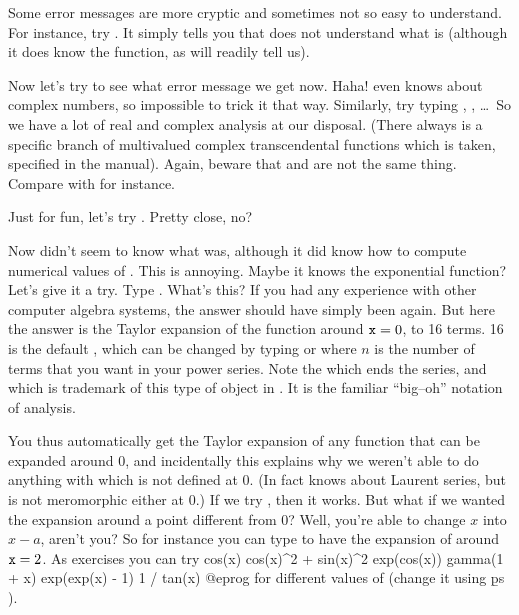 Some error messages are more cryptic and sometimes not so easy to understand.
For instance, try . It simply tells you that  does not
understand what  is (although it does know the 
function, as  will readily tell us).

Now let's try  to see what error message we get now. Haha!
 even knows about complex numbers, so impossible to trick it that
way. Similarly, try typing , , \dots\ So we have a lot of real and complex analysis at our disposal.
(There always is a specific branch of multivalued complex transcendental
functions which is taken, specified in the manual). Again, beware that
 and  are not the same thing. Compare  with
 for instance.

Just for fun, let's try . Pretty close, no?

\medskip
Now  didn't seem to know what  was, although it did know
how to compute numerical values of . This is annoying. Maybe it
knows the exponential function? Let's give it a try. Type .
What's this? If you had any experience with other computer algebra systems,
the answer should have simply been  again. But here the answer is
the Taylor expansion of the function around ${\tt x}=0$, to 16 terms. 16 is
the default , which can be changed by typing  or  where $n$ is the number of terms
that you want in your power series. Note the  which ends the
series, and which is trademark of this type of object in . It is the
familiar ``big--oh'' notation of analysis.

You thus automatically get the Taylor expansion of any function that can be
expanded around $0$, and incidentally this explains why we weren't able to do
anything with  which is not defined at $0$. (In fact 
knows about Laurent series, but  is not meromorphic either at
$0$.) If we try , then it works. But what if we wanted the
expansion around a point different from 0? Well, you're able to change $x$
into $x-a$, aren't you? So for instance you can type  to have
the expansion of  around ${\tt x}=2$. As exercises you can try
\bprog
  cos(x)
  cos(x)^2 + sin(x)^2
  exp(cos(x))
  gamma(1 + x)
  exp(exp(x) - 1)
  1 / tan(x)
@eprog\noindent
for different values of  (change it using \b{ps}
).

